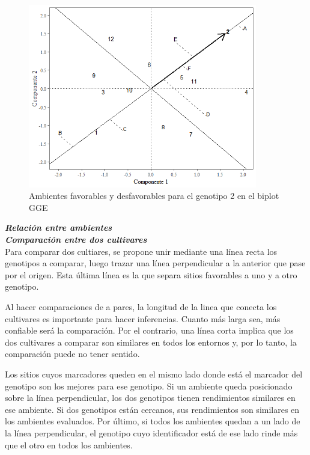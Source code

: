 \begin{figure}[H]
	\begin{center}
		\includegraphics[width=10cm]{./Graficos/gen_GGE.png}
	\end{center}
	\caption{Ambientes favorables y desfavorables para el genotipo 2 en el biplot GGE}
	\label{fig:fig313}
\end{figure}

\textbf{\emph{Relación entre ambientes}}\\


\textbf{\emph{Comparación entre dos cultivares}}\\

Para comparar dos cultiares, se propone unir mediante una línea recta los genotipos a comparar, luego trazar una línea perpendicular a la anterior que pase por el origen. Esta última línea es la que separa sitios favorables a uno y a otro genotipo.

Al hacer comparaciones de a pares, la longitud de la linea que conecta los cultivares es importante para hacer inferencias. Cuanto más larga sea, más confiable será la comparación. Por el contrario, una línea corta implica que los dos cultivares a comparar son similares en todos los entornos y, por lo tanto, la comparación puede no tener sentido.


Los sitios cuyos marcadores queden en el mismo lado donde está el marcador del genotipo son los mejores para ese genotipo. Si un ambiente queda posicionado sobre la línea perpendicular, los dos genotipos tienen rendimientos similares en ese ambiente. Si dos genotipos están cercanos, sus rendimientos son similares en los ambientes evaluados. Por último, si todos los ambientes quedan a un lado de la línea perpendicular, el genotipo cuyo identificador está de ese lado rinde más que el otro en todos los ambientes.


